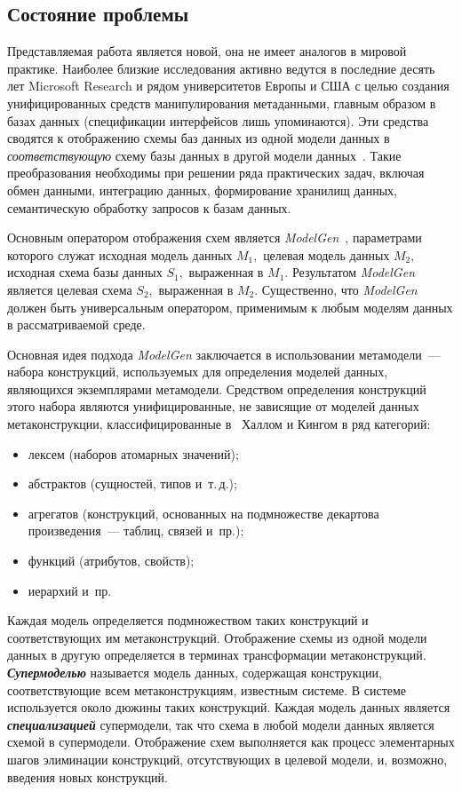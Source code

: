 \begin{multicols}{2}
\section{Состояние проблемы}

Представляемая работа является новой, она не имеет аналогов в мировой
практике. Наиболее близкие исследования активно ведутся в последние десять
лет Microsoft Research и рядом университетов Европы и США с
целью создания унифицированных средств манипулирования метаданными,
главным образом в базах данных (спецификации интерфейсов лишь
упоминаются). Эти средства сводятся к отображению схемы баз данных из
одной модели данных в {\em соответствующую} схему базы данных в другой
модели данных~\cite{At07}. Такие преобразования необходимы при решении ряда
практических задач, включая обмен данными, интеграцию данных, формирование
хранилищ данных, семантическую обработку запросов к базам данных.

Основным оператором отображения схем является {\em ModelGen}~\cite{At05},
параметрами которого служат исходная модель данных $M_1,$
целевая модель данных $M_2,$ исходная схема базы данных $S_1,$
выраженная в $M_1.$ Результатом {\em ModelGen} является целевая схема
$S_2,$ выраженная в $M_2.$ Существенно, что {\em ModelGen} должен быть
универсальным оператором, применимым к любым моделям данных в
рассматриваемой среде.

Основная идея подхода {\it ModelGen} заключается в использовании метамодели~--- набора
конструкций, используемых для определения моделей данных, являющихся
экземплярами метамодели. Средством определения конструкций этого набора
являются унифицированные, не зависящие от моделей данных метаконструкции,
классифицированные в~\cite{Hu87} Халлом и Кингом в ряд категорий:
\begin{itemize}
\item лексем (наборов атомарных значений);
\item абстрактов (сущностей, типов и~т.\,д.);
\item агрегатов (конструкций, основанных на подмножестве
декартова произведения~--- таблиц, связей и~пр.);
\item функций (атрибутов, свойств);
\item иерархий и~пр.
\end{itemize}

Каждая модель определяется подмножеством таких конструкций и
соответствующих им метаконструкций. Отображение схемы из одной модели
данных в другую определяется в терминах трансформации метаконструкций.
{\bfseries\textit{Супермоделью}} называется модель данных, содержащая
конструкции, соответствующие всем метаконструкциям, известным системе.
В системе~\cite{At07-1} используется около дюжины таких конструкций. Каждая
модель данных является {\bfseries\textit{специализацией}} супермодели, так
что схема в любой модели данных является схемой в супермодели. Отображение
схем выполняется как процесс элементарных шагов элиминации конструкций,
отсутствующих в целевой модели, и, возможно, введения новых конструкций.


\end{multicols}
